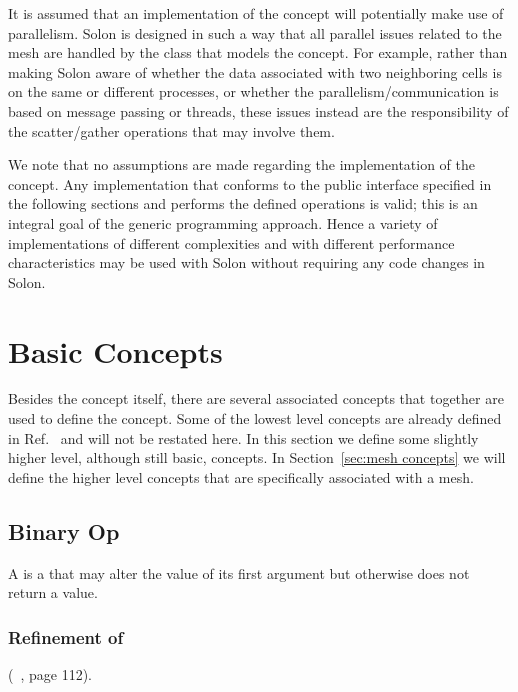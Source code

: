 \documentclass[note]{newmemo}
\begin{document}
It is assumed that an implementation of the  concept will potentially make use of
parallelism. Solon is designed in such a way that all parallel issues
related to the mesh are handled by the class that models the
 concept. For example,
rather than making Solon aware of whether the data associated with two 
neighboring cells is on the same or different processes, or whether
the parallelism/communication is based on message passing or threads,
these issues instead are the responsibility of the scatter/gather
operations that may involve them.

We note that no assumptions are made regarding the implementation of
the  concept. Any
implementation that conforms to the public interface specified in the
following sections and performs the defined operations is valid; this
is an integral goal of the generic programming approach. Hence a
variety of implementations of different complexities and with
different performance characteristics may be used with Solon without
requiring any code changes in Solon.

\section{Basic Concepts}
\label{sec:basic concepts}

Besides the  concept
itself, there are several associated concepts that together are used
to define the 
concept. Some of the lowest level concepts are already defined in
Ref.~\cite{au99} and will not be restated here. In this section we
define some slightly higher level, although still basic, concepts. In
Section~\ref{sec:mesh concepts} we will define the higher level
concepts that are specifically associated with a mesh.

\subsection{Binary Op}

A  is a  that may alter
the value of its first argument but otherwise does not return a
value.

\subsubsection{Refinement of}
 (~\cite{au99}, page 112).
\end{document}
